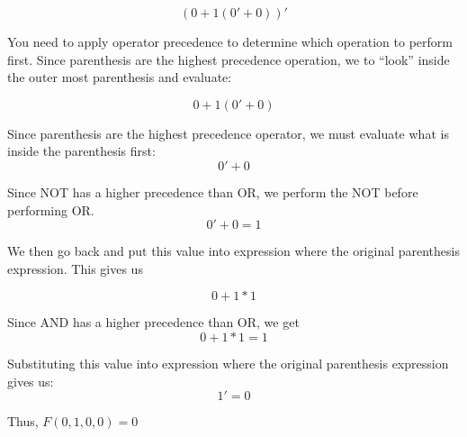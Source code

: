 $$(0 + 1(0' + 0))'$$

You need to apply operator precedence to determine which operation to perform
first.  Since parenthesis are the highest precedence operation, we to ``look'' inside the
outer most parenthesis and evaluate:

$$0 + 1(0' + 0)$$

Since parenthesis are the highest precedence operator, we must evaluate what is inside the
parenthesis first:
$$0' + 0$$

Since NOT has a higher precedence than OR, we perform the NOT before performing OR.
$$0' + 0 = 1$$

We then go back and put this value into expression where the original parenthesis expression.
This gives us

$$0 + 1*1$$

Since AND has a higher precedence than OR, we get
$$0 + 1*1 = 1$$

Substituting this value into expression where the original parenthesis expression gives us:
$$1' = 0$$

Thus, $F(0,1,0,0) = 0$
\vspace{0.2cm}

